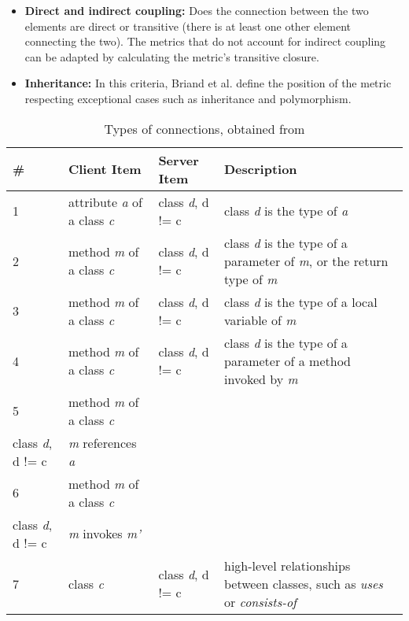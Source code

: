 \begin{itemize}
  \item \textbf{Direct and indirect coupling:} Does the connection between the two elements are direct or transitive (there is at least one other element connecting the two). The metrics that do not account for indirect coupling can be adapted by calculating the metric's transitive closure.

  \item \textbf{Inheritance:} In this criteria, Briand et al. \cite{briand1999unified} define the position of the metric respecting exceptional cases such as inheritance and polymorphism.
\end{itemize}

\begin{table}[ht!]
    \begin{center}
    \begin{tabularx}{\textwidth}{|l|l|l|X|}
    \hline
    \# & Client Item & Server Item & Description \\
    \hline\hline
    1   & attribute \textit{a} of a class \textit{c} & class \textit{d}, d != c & class \textit{d} is the type of \textit{a} \\
    \hline
    2   & method \textit{m} of a class \textit{c} & class \textit{d}, d != c  & class \textit{d} is the type of a parameter of \textit{m}, or the return type of \textit{m} \\
    \hline
    3   & method \textit{m} of a class \textit{c} & class \textit{d}, d != c  & class \textit{d} is the type of a local variable of \textit{m} \\
    \hline
    4   & method \textit{m} of a class \textit{c} & class \textit{d}, d != c  & class \textit{d} is the type of a parameter of a method invoked by \textit{m} \\
    \hline
    5   & method \textit{m} of a class \textit{c} & \begin{tabular}[c]{@{}l@{}}attribute \textit{a} of a\\ class \textit{d}, d != c \end{tabular}  & \textit{m} references \textit{a} \\
    \hline
    6   & method \textit{m} of a class \textit{c} & \begin{tabular}[c]{@{}l@{}}method \textit{m'} of a\\ class \textit{d}, d != c \end{tabular} & \textit{m} invokes \textit{m'} \\
    \hline
    7   & class \textit{c} & class \textit{d}, d != c  & high-level relationships between classes, such as \textit{uses} or \textit{consists-of} \\
    \hline
    \end{tabularx}
    \end{center}
    \caption{Types of connections, obtained from \cite{briand1999unified}}
    \label{table:types-connections}
\end{table}

